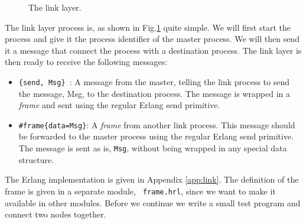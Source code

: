 \documentclass[a4paper,11pt]{article}
\begin{document}
\begin{figure}
\centering  
{}

\caption{The link layer.}
\label{fig:link}

\end{figure}


The link layer process is, as shown in Fig.\ref{fig:link} quite
simple. We will first start the process and give it the process
identifier of the master process. We will then send it a message that
connect the process with a destination process. The link layer is then
ready to receive the following messages:

\begin{itemize}

  \item {\tt \{send, Msg\} }: A message from the master, telling the link
    process to send the message, Msg, to the destination process. The
    message is wrapped in a {\em frame} and sent using the
    regular Erlang send primitive.

    \item {\tt \#frame\{data=Msg\}}: A  {\em frame} from another link
      process. This message should be forwarded to the master process
      using the regular Erlang send primitive. The message is sent as
      is, {\tt Msg}, without being wrapped in any special data structure.
\end{itemize}

The Erlang implementation is given in Appendix \ref{app:link}. The
definition of the frame is given in a separate module, {\tt
  frame.hrl}, since we want to make it available in other
modules. Before we continue we write a small test program and connect
two nodes together.
\end{document}
